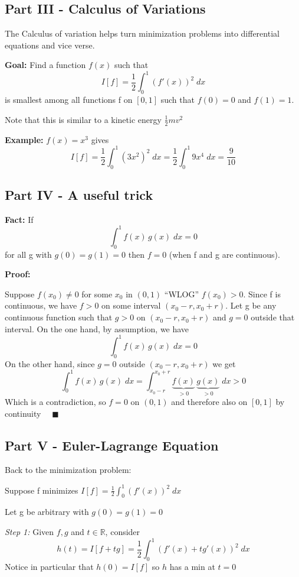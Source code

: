 \documentclass[12pt]{article}
\begin{document}
\subsection*{Part III - Calculus of Variations}
The Calculus of variation helps turn minimization problems into differential equations and vice verse. 

\textbf{Goal:} Find a function $f(x)$ such that 
\[I[f] = \frac{1}{2}\int_0^1 (f'(x))^2\; dx\]
is smallest among all functions f on $[0, 1]$ such that $f(0) = 0$ and $f(1) =1$.

Note that this is similar to a kinetic energy $\frac{1}{2}mv^2$

\textbf{Example:} $f(x) = x^3$ gives 
\[I[f] = \frac{1}{2}\int_0^1 (3x^2)^2\; dx = \frac{1}{2}\int_0^1 9x^4 \; dx = \frac{9}{10}\]

\subsection*{Part IV - A useful trick}
\textbf{Fact:} If 
\[\int_0^1 f(x)\, g(x) \; dx = 0\]
for all g with $g(0) = g(1) = 0$ then $f = 0$ (when f and g are continuous).

\textbf{Proof:}

Suppose $f(x_0) \neq 0$ for some $x_0$ in $(0, 1)$ ``WLOG'' $f(x_0) >0$. Since f is continuous, we have $f > 0$ on some interval $(x_0 - r, x_0 + r)$. Let g be any continuous function such that $g>0$ on $(x_0 - r, x_0 + r)$ and $g = 0$ outside that interval. On the one hand, by assumption, we have 
\[\int_0^1 f(x)\, g(x) \; dx =0\]
On the other hand, since $g = 0$ outside $(x_0 - r, x_0 + r)$ we get 
\[\int_0^1 f(x)\, g(x)\;dx = \int_{x_0 - r}^{x_0 + r} \underbrace{f(x)}_{>0}\, \underbrace{g(x)}_{>0} \; dx > 0\]
Which is a contradiction, so $f = 0$ on $(0, 1)$ and therefore also on $[0, 1]$ by continuity $\quad \blacksquare$

\subsection*{Part V - Euler-Lagrange Equation}
Back to the minimization problem:
\begin{center}
    Suppose f minimizes $I[f] = \frac{1}{2}\int_0^1 (f'(x))^2\; dx$
\end{center}
Let g be arbitrary with $g(0) = g(1) = 0$ 

\emph{Step 1:} Given $f, g$ and $t \in \mathbb{R}$, consider 
\[h(t) = I[f + tg] = \frac{1}{2}\int_0^1 (f'(x) + tg'(x))^2\; dx\]
Notice in particular that $h(0) = I[f]$ so $h$ has a min at $t=0$
\end{document}
